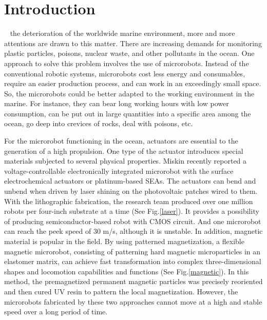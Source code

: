 \documentclass[journal,svgnames,twocolumn,x11names]{IEEEtran}
\begin{document}
\section{Introduction}
~%
the deterioration of the worldwide marine environment, more and more attentions are drawn to this matter. There are increasing demands for monitoring plastic particles, poisons, nuclear waste, and other pollutants in the ocean. One approach to solve this problem involves the use of microrobots. Instead of the conventional robotic systems, microrobots cost less energy and consumables, require an easier production process, and can work in an exceedingly small space. So, the microrobots could be better adapted to the working environment in the marine. For instance, they can bear long working hours with low power consumption, can be put out in large quantities into a specific area among the ocean, go deep into crevices of rocks, deal with poisons, etc.

For the microrobot functioning in the ocean, actuators are essential to the generation of a high propulsion. One type of the actuator introduces special materials subjected to several physical properties. Miskin recently reported a voltage-controllable electronically integrated microrobot with the surface electrochemical actuators or platinum-based SEAs\cite{Miskin2020}. The actuators can bend and unbend when driven by laser shining on the photovoltaic patches wired to them. With the lithographic fabrication, the research team produced over one million robots per four-inch substrate at a time (See Fig.\ref{laser}). It provides a possibility of producing semiconductor-based robot with CMOS circuit. And one microrobot can reach the peek speed of 30 \textmu m/s, although it is unstable. In addition, magnetic material is popular in the field. By using patterned magnetization, a flexible magnetic microrobot, consisting of patterning hard magnetic microparticles in an elastomer matrix, can achieve fast transformation into complex three-dimensional shapes and locomotion capabilities and functions\cite{Xu2019} (See Fig.\ref{magnetic}). In this method, the premagnetized permanent magnetic particles was precisely reoriented and then cured UV resin to pattern the local magnetization. However, the microrobots fabricated by these two approaches cannot move at a high and stable speed over a long period of time.
\end{document}
